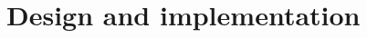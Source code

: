 \documentclass{epr400}
\begin{document}
\renewcommand{\eprthepartname}{Design and implementation}
\setcounter{section}{2}
\section{Design and implementation}

\clearpage


\clearpage
\appendix

\clearpage

\end{document}
